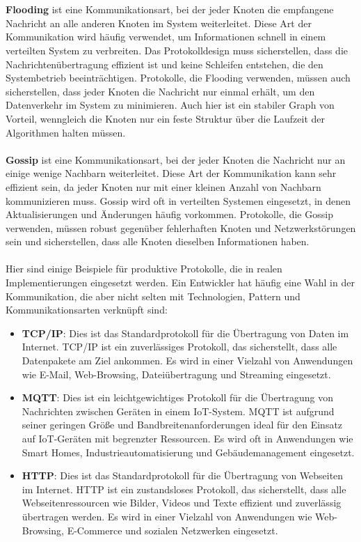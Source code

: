 \\\\
\textbf{Flooding} ist eine Kommunikationsart, bei der jeder Knoten die empfangene Nachricht an alle anderen Knoten im System weiterleitet. Diese Art der Kommunikation wird häufig verwendet, um Informationen schnell in einem verteilten System zu verbreiten. Das Protokolldesign muss sicherstellen, dass die Nachrichtenübertragung effizient ist und keine Schleifen entstehen, die den Systembetrieb beeinträchtigen. Protokolle, die Flooding verwenden, müssen auch sicherstellen, dass jeder Knoten die Nachricht nur einmal erhält, um den Datenverkehr im System zu minimieren.
Auch hier ist ein stabiler Graph von Vorteil, wenngleich die Knoten nur ein feste Struktur über die Laufzeit der Algorithmen halten müssen.
\\\\
\textbf{Gossip} ist eine Kommunikationsart, bei der jeder Knoten die Nachricht nur an einige wenige Nachbarn weiterleitet. Diese Art der Kommunikation kann sehr effizient sein, da jeder Knoten nur mit einer kleinen Anzahl von Nachbarn kommunizieren muss. Gossip wird oft in verteilten Systemen eingesetzt, in denen Aktualisierungen und Änderungen häufig vorkommen. Protokolle, die Gossip verwenden, müssen robust gegenüber fehlerhaften Knoten und Netzwerkstörungen sein und sicherstellen, dass alle Knoten dieselben Informationen haben.
\\\\
Hier sind einige Beispiele für produktive Protokolle, die in realen Implementierungen eingesetzt werden. Ein Entwickler hat häufig eine Wahl in der Kommunikation, die aber nicht selten mit Technologien, Pattern und Kommunikationsarten verknüpft sind:
 \begin{itemize}
\item \textbf{TCP/IP}: Dies ist das Standardprotokoll für die Übertragung von Daten im Internet. TCP/IP ist ein zuverlässiges Protokoll, das sicherstellt, dass alle Datenpakete am Ziel ankommen. Es wird in einer Vielzahl von Anwendungen wie E-Mail, Web-Browsing, Dateiübertragung und Streaming eingesetzt.

\item  \textbf{MQTT}: Dies ist ein leichtgewichtiges Protokoll für die Übertragung von Nachrichten zwischen Geräten in einem IoT-System. MQTT ist aufgrund seiner geringen Größe und Bandbreitenanforderungen ideal für den Einsatz auf IoT-Geräten mit begrenzter Ressourcen. Es wird oft in Anwendungen wie Smart Homes, Industrieautomatisierung und Gebäudemanagement eingesetzt.

\item \textbf{HTTP}: Dies ist das Standardprotokoll für die Übertragung von Webseiten im Internet. HTTP ist ein zustandsloses Protokoll, das sicherstellt, dass alle Webseitenressourcen wie Bilder, Videos und Texte effizient und zuverlässig übertragen werden. Es wird in einer Vielzahl von Anwendungen wie Web-Browsing, E-Commerce und sozialen Netzwerken eingesetzt.
 \end{itemize}
